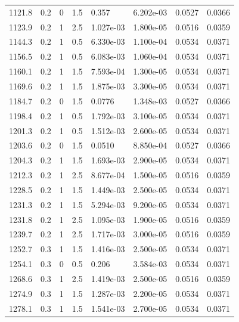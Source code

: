 \documentclass[preview]{standalone}
\begin{document}
{{{\begin{tabular}{L{1.2cm}C{1.2cm} C{0.3cm}C{0.5cm} C{1.4cm}C{1.4cm} C{1.4cm}C{1.4cm}}
  1121.8  &   0.2  & 0     & 1.5 &  0.357  & 6.202e-03  & 0.0527 &  0.0366   \\ 
  1123.9  &   0.2  & 1     & 2.5 &  1.027e-03  & 1.800e-05  & 0.0516 &  0.0359   \\ 
  1144.3  &   0.2  & 1     & 0.5 &  6.330e-03  & 1.100e-04  & 0.0534 &  0.0371   \\ 
  1156.5  &   0.2  & 1     & 0.5 &  6.083e-03  & 1.060e-04  & 0.0534 &  0.0371   \\ 
  1160.1  &   0.2  & 1     & 1.5 &  7.593e-04  & 1.300e-05  & 0.0534 &  0.0371   \\ 
  1169.6  &   0.2  & 1     & 1.5 &  1.875e-03  & 3.300e-05  & 0.0534 &  0.0371   \\ 
  1184.7  &   0.2  & 0     & 1.5 &  0.0776  & 1.348e-03  & 0.0527 &  0.0366   \\ 
  1198.4  &   0.2  & 1     & 0.5 &  1.792e-03  & 3.100e-05  & 0.0534 &  0.0371   \\ 
  1201.3  &   0.2  & 1     & 0.5 &  1.512e-03  & 2.600e-05  & 0.0534 &  0.0371   \\ 
  1203.6  &   0.2  & 0     & 1.5 &  0.0510  & 8.850e-04  & 0.0527 &  0.0366   \\ 
  1204.3  &   0.2  & 1     & 1.5 &  1.693e-03  & 2.900e-05  & 0.0534 &  0.0371   \\ 
  1212.3  &   0.2  & 1     & 2.5 &  8.677e-04  & 1.500e-05  & 0.0516 &  0.0359   \\ 
  1228.5  &   0.2  & 1     & 1.5 &  1.449e-03  & 2.500e-05  & 0.0534 &  0.0371   \\ 
  1231.3  &   0.2  & 1     & 1.5 &  5.294e-03  & 9.200e-05  & 0.0534 &  0.0371   \\ 
  1231.8  &   0.2  & 1     & 2.5 &  1.095e-03  & 1.900e-05  & 0.0516 &  0.0359   \\ 
  1239.7  &   0.2  & 1     & 2.5 &  1.717e-03  & 3.000e-05  & 0.0516 &  0.0359   \\ 
  1252.7  &   0.3  & 1     & 1.5 &  1.416e-03  & 2.500e-05  & 0.0534 &  0.0371   \\ 
  1254.1  &   0.3  & 0     & 0.5 &  0.206  & 3.584e-03  & 0.0534 &  0.0371   \\ 
  1268.6  &   0.3  & 1     & 2.5 &  1.419e-03  & 2.500e-05  & 0.0516 &  0.0359   \\ 
  1274.9  &   0.3  & 1     & 1.5 &  1.287e-03  & 2.200e-05  & 0.0534 &  0.0371   \\ 
  1278.1  &   0.3  & 1     & 1.5 &  1.541e-03  & 2.700e-05  & 0.0534 &  0.0371   \\ 

\end{tabular}}}}
\end{document}
